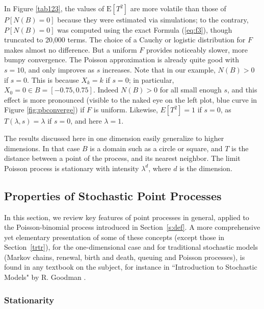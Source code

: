 \documentclass[10pt]{article}
\begin{document}
In Figure \ref{tab123}, the values of $\mbox{E}[T^2]$ are more volatile than those of $P[N(B)=0]$ because they were estimated via simulations; to the contrary, $P[N(B)=0]$ was computed using the exact Formula (\ref{eq:f3}), though truncated to 20,000 terms. The choice of a Cauchy or logistic distribution for $F$ makes almost no  difference. But a uniform $F$ provides noticeably slower, more bumpy convergence. The Poisson approximation is already quite good with $s=10$, and only improves as $s$ increases. Note that in our example, $N(B)>0$ if $s=0$. This is because $X_k=k$ if $s=0$; in particular, $X_0=0\in B=[-0.75, 0.75]$. Indeed $N(B)>0$ for all small  enough $s$, and this effect is more pronounced (visible to the naked eye on the left plot, blue curve in Figure \ref{fig:pbconverge}) if $F$ is uniform. Likewise, $E[T^2]=1$ if $s=0$, as $T(\lambda,s)=\lambda$ if $s=0$, and here $\lambda=1$. 

The results discussed here in one dimension easily generalize to higher dimensions. In that case $B$ is a domain such as a circle or square, and $T$ is the distance between a point of the process, and its nearest neighbor. The limit Poisson process is stationary with intensity $\lambda^d$, where $d$ is the dimension.

\subsection{Properties of Stochastic Point Processes}\label{stationarity}

In this section, we review key features of point processes in general, applied to the Poisson-binomial process introduced in Section~\ref{s:def}. A more comprehensive yet elementary presentation of some of these concepts (except those in Section~\ref{trtr}), for the one-dimensional case and for traditional stochastic models (Markov chains, renewal, birth and death, queuing and Poisson processes), is found in any textbook on the subject, for instance in ``Introduction to Stochastic Models" by R. Goodman \cite{goodman}.

\subsubsection{Stationarity}
\end{document}
